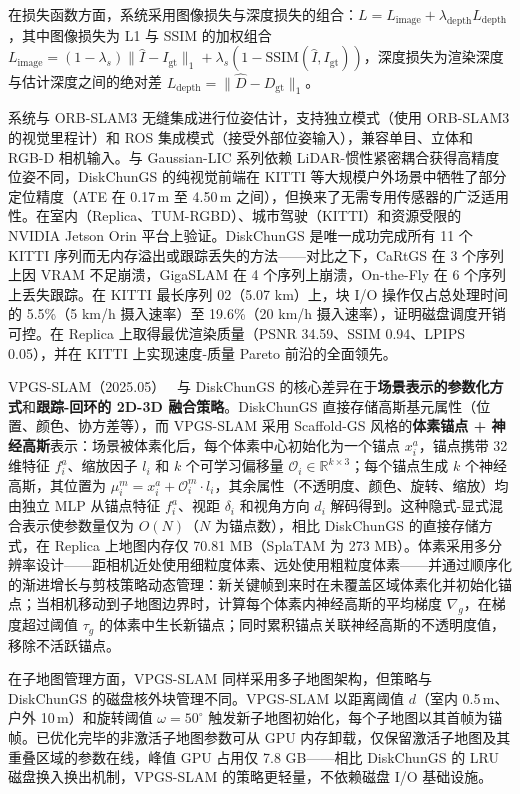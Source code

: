 在损失函数方面，系统采用图像损失与深度损失的组合：$L = L_{\mathrm{image}} + \lambda_{\mathrm{depth}} L_{\mathrm{depth}}$，其中图像损失为 L1 与 SSIM 的加权组合 $L_{\mathrm{image}} = (1-\lambda_s)\|\hat{I} - I_{\mathrm{gt}}\|_1 + \lambda_s(1 - \mathrm{SSIM}(\hat{I}, I_{\mathrm{gt}}))$，深度损失为渲染深度与估计深度之间的绝对差 $L_{\mathrm{depth}} = \|\hat{D} - D_{\mathrm{gt}}\|_1$。

系统与 ORB-SLAM3 无缝集成进行位姿估计，支持独立模式（使用 ORB-SLAM3 的视觉里程计）和 ROS 集成模式（接受外部位姿输入），兼容单目、立体和 RGB-D 相机输入。与 Gaussian-LIC 系列依赖 LiDAR-惯性紧密耦合获得高精度位姿不同，DiskChunGS 的纯视觉前端在 KITTI 等大规模户外场景中牺牲了部分定位精度（ATE 在 0.17\,m 至 4.50\,m 之间），但换来了无需专用传感器的广泛适用性。在室内（Replica、TUM-RGBD）、城市驾驶（KITTI）和资源受限的 NVIDIA Jetson Orin 平台上验证。DiskChunGS 是唯一成功完成所有 11 个 KITTI 序列而无内存溢出或跟踪丢失的方法——对比之下，CaRtGS 在 3 个序列上因 VRAM 不足崩溃，GigaSLAM 在 4 个序列上崩溃，On-the-Fly 在 6 个序列上丢失跟踪。在 KITTI 最长序列 02（5.07 km）上，块 I/O 操作仅占总处理时间的 5.5\%（5 km/h 摄入速率）至 19.6\%（20 km/h 摄入速率），证明磁盘调度开销可控。在 Replica 上取得最优渲染质量（PSNR 34.59、SSIM 0.94、LPIPS 0.05），并在 KITTI 上实现速度-质量 Pareto 前沿的全面领先。

VPGS-SLAM（2025.05）~\cite{2505_18992} 与 DiskChunGS 的核心差异在于\textbf{场景表示的参数化方式}和\textbf{跟踪-回环的 2D-3D 融合策略}。DiskChunGS 直接存储高斯基元属性（位置、颜色、协方差等），而 VPGS-SLAM 采用 Scaffold-GS 风格的\textbf{体素锚点 + 神经高斯}表示：场景被体素化后，每个体素中心初始化为一个锚点 $x_i^a$，锚点携带 32 维特征 $f_i^a$、缩放因子 $l_i$ 和 $k$ 个可学习偏移量 $\mathcal{O}_i \in \mathbb{R}^{k \times 3}$；每个锚点生成 $k$ 个神经高斯，其位置为 $\mu_i^m = x_i^a + \mathcal{O}_i^m \cdot l_i$，其余属性（不透明度、颜色、旋转、缩放）均由独立 MLP 从锚点特征 $f_i^a$、视距 $\delta_i$ 和视角方向 $d_i$ 解码得到。这种隐式-显式混合表示使参数量仅为 $O(N)$（$N$ 为锚点数），相比 DiskChunGS 的直接存储方式，在 Replica 上地图内存仅 70.81 MB（SplaTAM 为 273 MB）。体素采用多分辨率设计——距相机近处使用细粒度体素、远处使用粗粒度体素——并通过顺序化的渐进增长与剪枝策略动态管理：新关键帧到来时在未覆盖区域体素化并初始化锚点；当相机移动到子地图边界时，计算每个体素内神经高斯的平均梯度 $\nabla_g$，在梯度超过阈值 $\tau_g$ 的体素中生长新锚点；同时累积锚点关联神经高斯的不透明度值，移除不活跃锚点。

在子地图管理方面，VPGS-SLAM 同样采用多子地图架构，但策略与 DiskChunGS 的磁盘核外块管理不同。VPGS-SLAM 以距离阈值 $d$（室内 0.5\,m、户外 10\,m）和旋转阈值 $\omega = 50^\circ$ 触发新子地图初始化，每个子地图以其首帧为锚帧。已优化完毕的非激活子地图参数可从 GPU 内存卸载，仅保留激活子地图及其重叠区域的参数在线，峰值 GPU 占用仅 7.8 GB——相比 DiskChunGS 的 LRU 磁盘换入换出机制，VPGS-SLAM 的策略更轻量，不依赖磁盘 I/O 基础设施。

